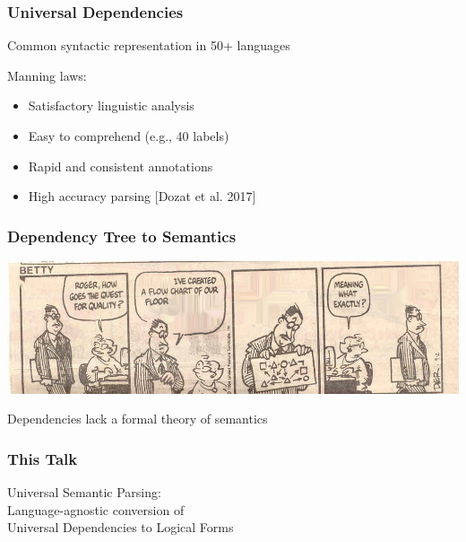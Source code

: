 \documentclass[mathserif,12pt]{beamer}
\begin{document}
\begin{frame}
\frametitle{Universal Dependencies}
\large

Common syntactic representation in 50+ languages

\vspace{2em}

Manning laws: 
\begin{itemize}
\item Satisfactory linguistic analysis

\vspace{1em}
\item Easy to comprehend (e.g., 40 labels)

\vspace{1em}
\item Rapid and consistent annotations

\vspace{1em}
\item High accuracy parsing {\footnotesize [Dozat et al. 2017]}
\end{itemize}
\end{frame}

\begin{frame}
\frametitle{Dependency Tree to Semantics}
\centering

\vspace{1em}

\includegraphics[trim=26em 0em 3.8em 2em,clip=true,scale=0.4]{figures/syntax-to-semantics-cartoon}

\vspace{2em}

\Large
 Dependencies \alert{lack} a formal theory of semantics
\end{frame}

\begin{frame}
 \frametitle{This Talk}
 \Large \centering

Universal Semantic Parsing:\\
Language-agnostic conversion of \\Universal Dependencies to Logical Forms
 
\end{frame}
\end{document}
